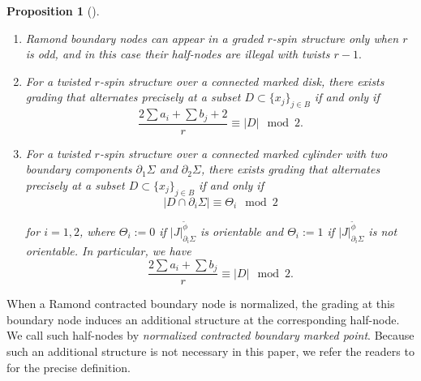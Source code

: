 \documentclass[11pt]{amsart}
\newtheorem{prop}[dummy]{Proposition}
\theoremstyle{definition}
\theoremstyle{remark}
\newcommand{\<}{\left<}
\renewcommand{\>}{\right>}
\numberwithin{equation}{section}
\begin{document}
\begin{prop}[{\cite[Proposition 2.3]{BCT2}}]
\begin{enumerate}
\item\label{it Ramond boundary node}
Ramond boundary nodes can appear in a graded $r$-spin structure only when %
$r$ is odd, and in %
this case their %
half-nodes are illegal with twists %
$r-1.$

\item\label{it lift compatible parity}
For a twisted $r$-spin structure over a connected marked disk, there exists %
grading that alternates precisely at a subset $D \subset \{x_j\}_{j \in B}$ if and only %
if
\begin{equation}\label{eq parity}
   \frac{2\sum a_i + \sum b_j+ 2}{r}\equiv |D| \mod 2.
\end{equation}

\item\label{it lift compatible parity g=1}
For a twisted $r$-spin structure over a connected marked cylinder with two %
boundary components $\partial_1 \Sigma$ and $\partial_2 \Sigma$, there exists grading that alternates precisely at a subset $D \subset \{x_j\}_{j \in B}$ if and only if
\begin{equation}\label{eq boundarywise pairty}
    |D\cap \partial_i \Sigma| \equiv  \Theta_i \mod 2
\end{equation}

for $i=1,2$, where $\Theta_i:=0$ if $|J|^{\tilde\phi}_{\partial_i\Sigma}$ is orientable and $\Theta_i:=1$ if $|J|^{\tilde\phi}_{\partial_i\Sigma}$ is not orientable.
In particular, we have
\begin{equation}\label{eq compatitable pairty g=1}
   \frac{2\sum a_i + \sum b_j}{r} \equiv |D| \mod 2.
\end{equation}

\end{enumerate}
\end{prop}

When a Ramond contracted boundary node is normalized, the grading at this boundary node induces an additional structure at the corresponding half-node. We call such half-nodes by \textit{normalized contracted boundary marked point}. Because such an additional structure is not necessary in this paper, we refer the readers to \cite[Definition 2.5]{TZ1} for the precise definition. 
\end{document}
